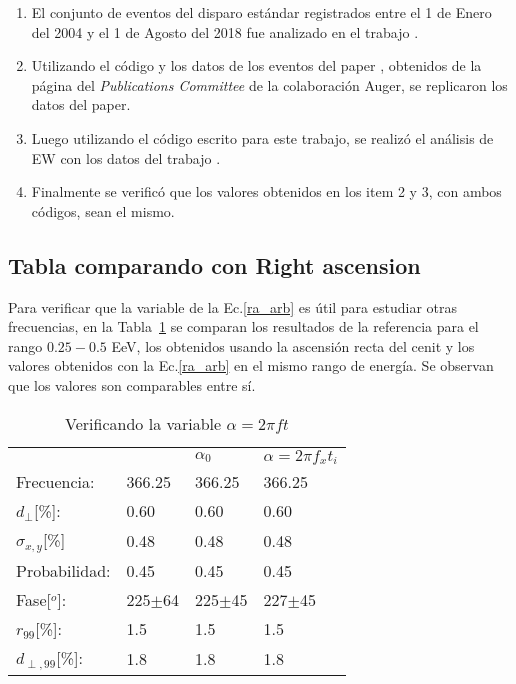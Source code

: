 \begin{enumerate}
    \item El conjunto de eventos del disparo estándar registrados entre el 1 de Enero del 2004 y el 1 de Agosto del 2018 fue analizado en el trabajo \cite{Aab_2020}.
    \item Utilizando el código y los datos de los eventos del paper \cite{Aab_2020}, obtenidos de la página del \emph{Publications Committee} de la colaboración Auger, se replicaron los datos del paper. 
    \item Luego utilizando el código escrito para este trabajo, se realizó el análisis de EW con los datos del trabajo \cite{Aab_2020}. 
    \item Finalmente se verificó que los valores obtenidos en los item 2 y 3, con  ambos códigos, sean el mismo.
\end{enumerate}

\subsection{Tabla comparando con Right ascension}

Para verificar que la variable de la Ec.\ref{ra_arb} es útil para estudiar otras frecuencias, en la Tabla~\ref{tab:comp_vars} se comparan los resultados de la referencia para el rango $0.25-0.5$ EeV, los obtenidos usando la ascensión recta del cenit y los valores obtenidos con la Ec.\ref{ra_arb} en el mismo rango de energía. Se observan que los valores son comparables entre sí.


\begin{table}[H]
    \begin{small}
        \begin{center}
            \begin{tabular}[c]{l|l|l|l}
                                    & \cite{Aab_2020} & $\alpha_0$   & $\alpha=2\pi f_xt_i$   \\ 
                Frecuencia:         & 366.25          &  366.25      &  366.25            \\
                $d_\perp$[\%]:      & 0.60            &  0.60        &  0.60              \\
                $\sigma_{x,y}$[\%]  & 0.48            &  0.48        &  0.48              \\ 
                Probabilidad:       & 0.45            &  0.45        &  0.45              \\
                Fase[$^o$]:         & 225$\pm$64\cite{discrepancia} & 225$\pm$45   &  227$\pm$45          \\
                $r_{99}$[\%]:       & 1.5             &  1.5       &  1.5             \\
                $d_{\perp,99}$[\%]: & 1.8             &  1.8       &  1.8             \\
            \end{tabular}
        \end{center}
        \caption{Verificando la  variable $\alpha=2\pi ft$}
        \label{tab:comp_vars}
    \end{small}
\end{table}

